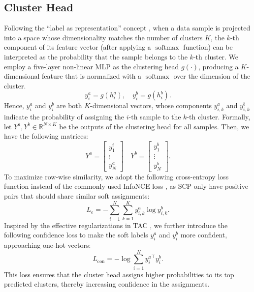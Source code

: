 \subsection{Cluster Head}
Following the “label as representation” concept \cite{li2021contrastive}, when a data sample is projected into a space whose dimensionality matches the number of clusters \(K\), the \(k\)-th component of its feature vector (after applying a $\operatorname{softmax}$  function) can be interpreted as the probability that the sample belongs to the \(k\)-th cluster. We employ a five-layer non-linear MLP as the clustering head \(g(\cdot)\), producing a  \(K\)-dimensional feature that is normalized with a $\operatorname{softmax}$  over the dimension of the cluster.
\[
y_i^a = g(h_i^a), 
\quad 
y_i^b = g(h_i^b).
\]
Hence, \(y_i^a\) and \(y_i^b\) are both \(K\)-dimensional vectors, whose components \(y_{i,k}^a\) and \(y_{i,k}^b\) indicate the probability of assigning the \(i\)-th sample to the \(k\)-th cluster. Formally, let \(Y^a, Y^b \in \mathbb{R}^{N \times K}\) be the outputs of the clustering head for all samples. Then, we have the following matrices:
\[
Y^a = \begin{bmatrix}
y^i_1 \\
\vdots \\
y^a_N
\end{bmatrix}
\quad
Y^b = \begin{bmatrix}
y^b_1 \\
\vdots \\
y^b_N
\end{bmatrix}.
\]
To maximize row-wise similarity, we adopt the following cross-entropy loss function instead of the commonly used InfoNCE loss \cite{oord2018representation}, as SCP only have positive pairs that should share similar soft assignments:
\begin{equation}
L_e = - \sum_{i=1}^{N} \sum_{k=1}^{K} y^{a}_{i,k} \log y^{b}_{i,k}.
\end{equation}
Inspired by the effective regularizations in TAC \cite{li2023image}, we further introduce the following confidence loss to make the soft labels \( y^{a}_i \) and \( y^{b}_i \) more confident, approaching one-hot vectors:
\begin{equation}
L_{\text{con}} = - \log \sum_{i=1}^N {y^a_i}^\top y^b_i.
\end{equation}
This loss ensures that the cluster head assigns higher probabilities to its top predicted clusters, thereby increasing confidence in the assignments. 

